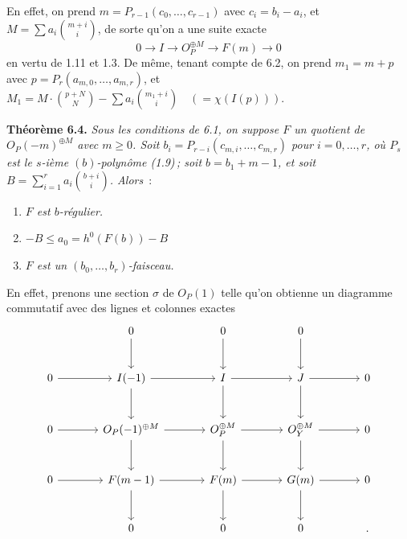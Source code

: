 
En
effet, on prend $m=P_{r-1}(c_0,\ldots,c_{r-1})$ avec $c_i=b_i-a_i$, et $M=\sum a_i\binom{m+i}{i}$, de sorte qu'on a une suite exacte
\[
   0\longrightarrow I\longrightarrow {O}_P^{\oplus M}
   \longrightarrow F(m)\longrightarrow0
\]
en vertu de 1.11 et 1.3. De m\^eme, tenant compte de 6.2, on prend $m_1=m+p$ avec $p=P_r(a_{m,0},\ldots,a_{m,r})$, et $M_1=M\cdot\binom{p+N}{N}-\sum a_i\binom{m_1+i}{i}\quad(=\chi(I(p)))$.

\textbf{Th\'eor\`eme 6.4.} \emph{Sous les conditions de 6.1, on suppose $F$ un quotient de ${O}_P(-m)^{\oplus M}$ avec $m\ge0$. Soit $b_i=P_{r-i}(c_{m,i},\ldots,c_{m,r})$ pour $i=0,\ldots,r$, o\`u $P_s$ est le $s$-i\`eme $(b)$-polyn\^ome (1.9)\,; soit $b=b_1+m-1$, et soit $B=\sum_{i=1}^{r} a_i\binom{b+i}{i}$. Alors}~:
\begin{enumerate}[label=(\roman*)]
\item \emph{$F$ est $b$-r\'egulier.}
\item \emph{$-B\le a_0=h^0(F(b))-B$}
\item \emph{$F$ est un $(b_0,\ldots,b_r)$-faisceau.}
\end{enumerate}

En effet, prenons une section $\sigma$ de ${O}_P(1)$ telle qu'on obtienne un diagramme commutatif avec des lignes et colonnes exactes
\[
\begin{tikzcd}[column sep=large,row sep=large]
&0 \arrow[d]&0 \arrow[d]&0 \arrow[d]&\\
0 \arrow[r]&I(-1) \arrow[r] \arrow[d]&I \arrow[r] \arrow[d]&J \arrow[r] \arrow[d]&0\\
0 \arrow[r]&{O}_P(-1)^{\oplus M} \arrow[r] \arrow[d]&{O}_P^{\oplus M} \arrow[r] \arrow[d]&{O}_Y^{\oplus M} \arrow[r] \arrow[d]&0\\
0 \arrow[r]&F(m-1) \arrow[r] \arrow[d]&F(m) \arrow[r] \arrow[d]&G(m) \arrow[r] \arrow[d]&0\\
&0&0&0&.
\end{tikzcd}
\]
